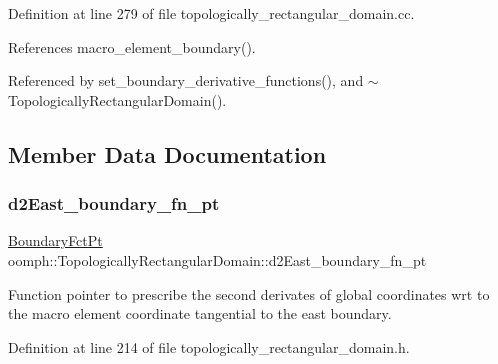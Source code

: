 Definition at line 279 of file topologically\+\_\+rectangular\+\_\+domain.\+cc.



References macro\+\_\+element\+\_\+boundary().



Referenced by set\+\_\+boundary\+\_\+derivative\+\_\+functions(), and $\sim$\+Topologically\+Rectangular\+Domain().



\subsection{Member Data Documentation}
\mbox{\label{classoomph_1_1TopologicallyRectangularDomain_a412d6225a5a6c3c55835e295e736d1c0}} 
\subsubsection{\texorpdfstring{d2\+East\+\_\+boundary\+\_\+fn\+\_\+pt}{d2East\_boundary\_fn\_pt}}
{\footnotesize\ttfamily \hyperlink{classoomph_1_1TopologicallyRectangularDomain_a8b2e24f5500d86c93aef509c5410e7cc}{Boundary\+Fct\+Pt} oomph\+::\+Topologically\+Rectangular\+Domain\+::d2\+East\+\_\+boundary\+\_\+fn\+\_\+pt\hspace{0.3cm}{\ttfamily [private]}}



Function pointer to prescribe the second derivates of global coordinates wrt to the macro element coordinate tangential to the east boundary. 



Definition at line 214 of file topologically\+\_\+rectangular\+\_\+domain.\+h.

\mbox{\label{classoomph_1_1TopologicallyRectangularDomain_a18674c5ad527a43b1fd3e3bdc15fff8f}} 
